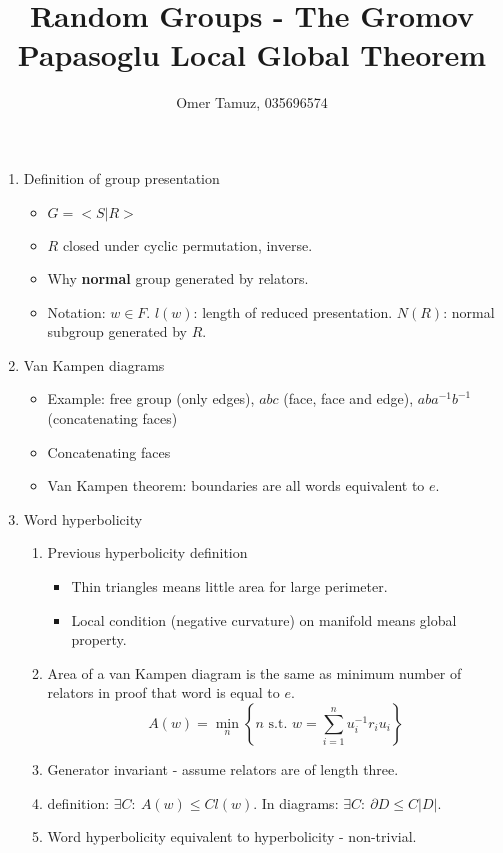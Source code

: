 \documentclass[11pt]{article} \usepackage{amssymb}
\begin{document}
\title{Random Groups - The Gromov Papasoglu Local Global Theorem}

 \author{Omer Tamuz, 035696574}
\maketitle

\begin{enumerate}
\item Definition of group presentation
  \begin{itemize}
  \item $G=<S|R>$
  \item $R$ closed under cyclic permutation, inverse.
  \item Why {\bf normal} group generated by relators.
  \item Notation: $w\in F$. $l(w)$: length of reduced presentation.
    $N(R)$: normal subgroup generated by $R$.
  \end{itemize}
\item Van Kampen diagrams
  \begin{itemize}
  \item Example: free group (only edges), $abc$ (face, face and edge),
    $aba^{-1}b^{-1}$ (concatenating faces)
  \item Concatenating faces
  \item Van Kampen theorem: boundaries are all words equivalent to $e$.
  \end{itemize} 
\item Word hyperbolicity
  \begin{enumerate}
  \item Previous hyperbolicity definition
    \begin{itemize}
    \item Thin triangles means little area for large perimeter.
    \item Local condition (negative curvature) on manifold means global 
      property.
    \end{itemize}
  \item Area of a van Kampen diagram is the same as minimum number of relators 
    in proof that word is equal to $e$.
    $$ A(w)=\min_n\left\{n\mbox{ s.t. } w=\sum_{i=1}^nu_i^{-1}r_iu_i\right\}$$
  \item Generator invariant - assume relators are of length three.
  \item definition: $\exists C:\: A(w)\leq Cl(w)$. In diagrams:
    $\exists C:\: \partial D\leq C|D|$.
  \item Word hyperbolicity equivalent to hyperbolicity - non-trivial.

\end{enumerate}
\end{enumerate}
\end{document}
